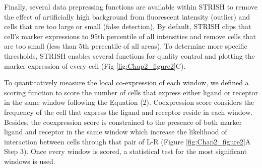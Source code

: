Finally, several data prepressing functions are available within STRISH to remove the effect of artificially high background from fluorescent intensity (outlier) and cells that are too large or small (false detection), By default, STRISH clips that cell’s marker expressions to 95th percentile of all intensities and remove cells that are too small (less than 5th percentile of all areas). To determine more specific thresholds, STRISH enables several functions for quality control and plotting the marker expression of every cell (\ie Fig \ref{fig:Chap2_figure2}C).

To quantitatively measure the local co-expression of each window, we defined a scoring function to score the number of cells that express either ligand or receptor in the same window following the Equation (2). Coexpression score considers the frequency of the cell that express the ligand and receptor reside in each window. Besides, the coexpression score is constrained to the presence of both marker ligand and receptor in the same window which increase the likelihood of interaction between cells through that pair of L-R (Figure \ref{fig:Chap2_figure2}A Step 3). Once every window is scored, a statistical test for the most significant windows is used.     

